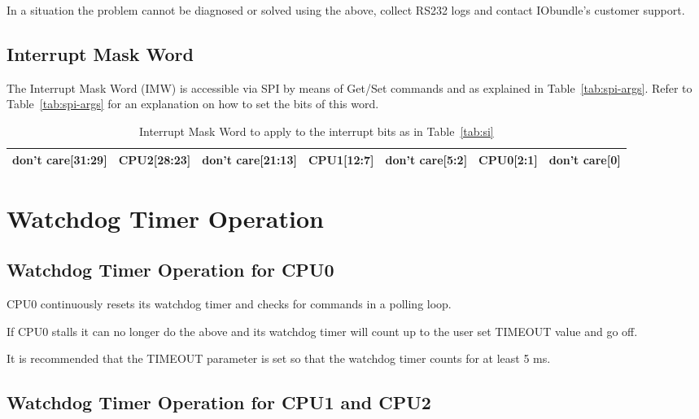 \documentclass{ug}
\theoremstyle{plain}
\begin{document}
In a situation the problem cannot be diagnosed or solved using the above,
collect RS232 logs and contact IObundle's customer support.

\subsection{Interrupt Mask Word}
\label{sec:intrrptMask}

The Interrupt Mask Word (IMW) is accessible via SPI by means of
Get/Set commands and as explained in Table~\ref{tab:spi-args}. Refer to
Table~\ref{tab:spi-args} for an explanation on how to set the bits of
this word.

\begin{table}[H]
  \begin{center}
    \begin{tabular}{|c|c|c|c|c|c|c|}
      \hline
      \hline
      \rowcolor{iob-green}
      \small{don't care[31:29]} & \textbf{CPU2[28:23]}  & \small{don't care[21:13]} & \textbf{CPU1[12:7]}  & \small{don't care[5:2]} & \textbf{CPU0[2:1]} & \small{don't care[0]}\\
      \hline
      \hline
    \end{tabular}
    \caption{Interrupt Mask Word to apply to the interrupt bits as in Table~\ref{tab:si} }
    \label{tab:intrrptMask}
  \end{center}
\end{table}

\clearpage

\section{Watchdog Timer Operation}
\label{sec:wtd}

\subsection{Watchdog Timer Operation for CPU0}

CPU0 continuously resets its watchdog timer and checks for commands in a polling
loop.

If CPU0 stalls it can no longer do the above and its watchdog timer will
count up to the user set TIMEOUT value and go off.

It is recommended that the TIMEOUT parameter is set so that the
watchdog timer counts for at least 5 ms.

\subsection{Watchdog Timer Operation for CPU1 and CPU2}
\end{document}
